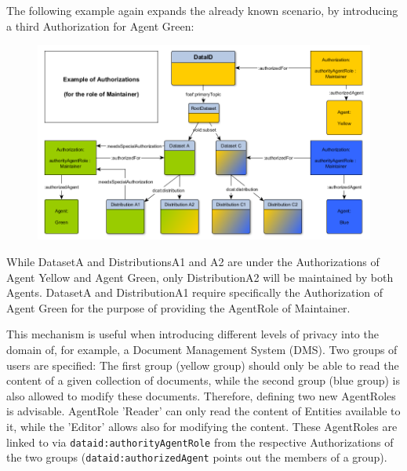\documentclass[a4paper,english,twoside,BCOR1.5cm,headsepline,DIV12,appendixprefix,final,12pt]{scrbook}
\newcommand{\prop}[1]{{{\texttt{#1}}}}
\begin{document}
The following example again expands the already known scenario, by introducing a third Authorization for Agent Green:

\begin{figure}[!htbp]
\centering
  \includegraphics[width=\textwidth]{images/AuthorizationExample5.png}
  \label{fig:dlaxioms}
\end{figure}

While DatasetA and DistributionsA1 and A2 are under the Authorizations of Agent Yellow and Agent Green, only DistributionA2 will be maintained by both Agents. DatasetA and DistributionA1 require specifically the Authorization of Agent Green for the purpose of providing the AgentRole of Maintainer.

This mechanism is useful when introducing different levels of privacy into the domain of, for example, a Document Management System (DMS). Two groups of users are specified: The first group (yellow group) should only be able to read the content of a given collection of documents, while the second group (blue group) is also allowed to modify these documents. Therefore, defining two new AgentRoles is advisable. AgentRole 'Reader' can only read the content of Entities available to it, while the 'Editor' allows also for modifying the content. These AgentRoles are linked to via \prop{dataid:authorityAgentRole} from the respective Authorizations of the two groups (\prop{dataid:authorizedAgent} points out the members of a group).
\end{document}
